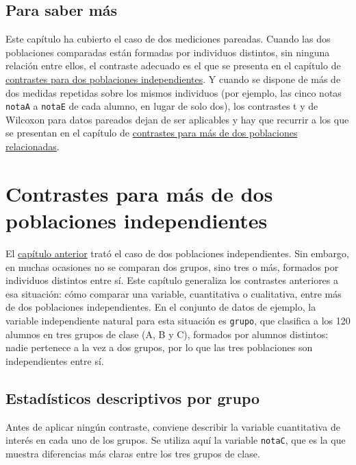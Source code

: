 \documentclass[
  spanish,
  a4paper,
]{scrreport}
\theoremstyle{definition}
\theoremstyle{definition}
\theoremstyle{remark}
\begin{document}
\section{Para saber más}\label{para-saber-muxe1s}

Este capítulo ha cubierto el caso de dos mediciones pareadas. Cuando las
dos poblaciones comparadas están formadas por individuos distintos, sin
ninguna relación entre ellos, el contraste adecuado es el que se
presenta en el capítulo de
\hyperref[contrastes-para-dos-poblaciones-independientes]{contrastes
para dos poblaciones independientes}. Y cuando se dispone de más de dos
medidas repetidas sobre los mismos individuos (por ejemplo, las cinco
notas \texttt{notaA} a \texttt{notaE} de cada alumno, en lugar de solo
dos), los contrastes t y de Wilcoxon para datos pareados dejan de ser
aplicables y hay que recurrir a los que se presentan en el capítulo de
\href{15-contrastes-medidas-repetidas.qmd}{contrastes para más de dos
poblaciones relacionadas}.

\chapter{Contrastes para más de dos poblaciones
independientes}\label{contrastes-para-muxe1s-de-dos-poblaciones-independientes}

El \hyperref[contrastes-para-dos-poblaciones-independientes]{capítulo
anterior} trató el caso de dos poblaciones independientes. Sin embargo,
en muchas ocasiones no se comparan dos grupos, sino tres o más, formados
por individuos distintos entre sí. Este capítulo generaliza los
contrastes anteriores a esa situación: cómo comparar una variable,
cuantitativa o cualitativa, entre más de dos poblaciones independientes.
En el conjunto de datos de ejemplo, la variable independiente natural
para esta situación es \texttt{grupo}, que clasifica a los 120 alumnos
en tres grupos de clase (A, B y C), formados por alumnos distintos:
nadie pertenece a la vez a dos grupos, por lo que las tres poblaciones
son independientes entre sí.

\section{Estadísticos descriptivos por
grupo}\label{estaduxedsticos-descriptivos-por-grupo-1}

Antes de aplicar ningún contraste, conviene describir la variable
cuantitativa de interés en cada uno de los grupos. Se utiliza aquí la
variable \texttt{notaC}, que es la que muestra diferencias más claras
entre los tres grupos de clase.
\end{document}
